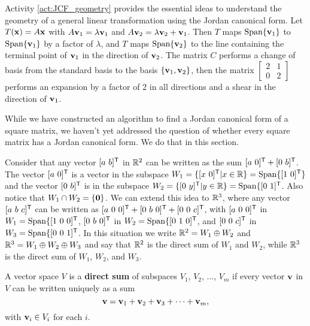 Activity \ref{act:JCF_geometry} provides the essential ideas to understand the geometry of a general linear transformation using the Jordan canonical form. Let $T(\mathbf{x}) = A\mathbf{x}$ with  $A \mathbf{v}_1 = \lambda \mathbf{v}_1$ and $A \mathbf{v}_2 = \lambda \mathbf{v}_2 + \mathbf{v}_1$. Then $T$ maps $\text{Span} \{\mathbf{v}_1\}$ to $\text{Span} \{\mathbf{v}_1\}$ by a factor of $\lambda$, and $T$ maps $\text{Span}\{\mathbf{v}_2\}$ to the line containing the terminal point of $\mathbf{v}_1$ in the direction of $\mathbf{v}_2$. 
The matrix $C$ performs a change of basis from the standard basis to the basis $\{\mathbf{v}_1, \mathbf{v}_2\}$, then the matrix $\left[ \begin{array}{cc} 2&1\\0&2 \end{array} \right]$ performs an expansion by a factor of 2 in all directions and a shear in the direction of $\mathbf{v}_1$. 


While we have constructed an algorithm to find a Jordan canonical form of a square matrix, we haven't yet addressed the question of whether every square matrix has a Jordan canonical form. We do that in this section. 

Consider that any vector $[a \ b]^{\tr}$ in $\mathbb{R}^2$ can be written as the sum $[a \ 0]^{\tr} + [0 \ b]^{\tr}$. The vector $[a \ 0]^{\tr}$ is a vector in the subspace $W_1 = \{ [x \ 0]^{\tr} | x \in \R\} = \Span \{[1 \ 0]^{\tr}\}$ and the vector $[0 \ b]^{\tr}$ is in the subspace $W_2 = \{[0 \ y]^{\mathsf{T}} | y \in \mathbb{R}\} = \text{Span}\{[0 \ 1]^{\mathsf{T}}$. Also notice that $W_1 \cap W_2 = \{\mathbf{0}\}$. We can extend this idea to $\mathbb{R}^3$, where any vector $[a \ b \ c]^{\mathsf{T}}$ can be written as $[a \ 0 \ 0]^{\tr} + [0 \ b \ 0]^{\tr} + [0 \ 0 \ c]^{\tr}$, with $[a \ 0 \ 0]^{\mathsf{T}}$ in $W_1 =  \Span\{[1 \ 0 \ 0]^{\tr}$, $[0 \ b \ 0]^{\tr}$ in $W_2 =  \Span\{[0 \ 1 \ 0]^{\tr}$,  and $[0 \ 0 \ c]^{\tr}$ in $W_3 =  \Span\{[0 \ 0 \ 1]^{\tr}$. In this situation we write $\mathbb{R}^2 = W_1 \oplus W_2$ and $\mathbb{R}^3 = W_1 \oplus W_2 \oplus W_3$ and say that $\mathbb{R}^2$ is the direct sum of $W_1$ and $W_2$, while $\mathbb{R}^3$ is the direct sum of $W_1$, $W_2$, and $W_3$. 

\begin{definition} A vector space $V$ is a \textbf{direct sum} of subspaces $V_1$, $V_2$, $\ldots$, $V_m$ if every vector $\mathbf{v}$ in $V$ can be written uniquely as a sum
\[\mathbf{v} = \mathbf{v}_1+\mathbf{v}_2+\mathbf{v}_3+\cdots + \mathbf{v}_m,\]
with $\mathbf{v}_i \in V_i$ for each $i$. 
\end{definition}

